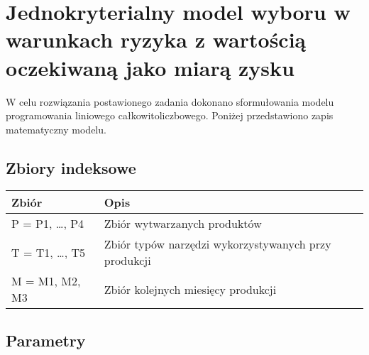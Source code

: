 \documentclass[12pt]{article}
\begin{document}
\section{Jednokryterialny model wyboru w warunkach ryzyka z wartością oczekiwaną jako miarą zysku}

W celu rozwiązania postawionego zadania dokonano sformułowania modelu programowania liniowego całkowitoliczbowego. Poniżej przedstawiono zapis matematyczny modelu.

\subsection{Zbiory indeksowe}

\begin{table}[h!]
\centering
\begin{tabular}{|l|l|}
\hline
Zbiór & Opis \\
\hline
P = P1, \ldots, P4 & Zbiór wytwarzanych produktów \\
\hline
T = T1, \ldots, T5 & Zbiór typów narzędzi wykorzystywanych przy produkcji \\
\hline
M = M1, M2, M3 & Zbiór kolejnych miesięcy produkcji \\
\hline
\end{tabular}
\end{table}

\subsection{Parametry}
\end{document}
